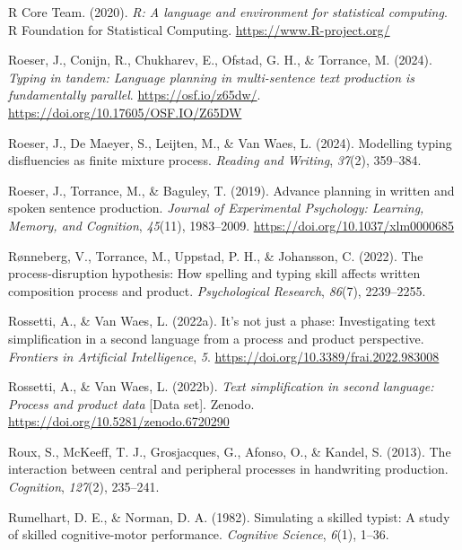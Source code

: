 \documentclass[
  man,floatsintext]{apa7}
\newlength{\cslhangindent}
\newlength{\cslentryspacingunit} %
\newenvironment{CSLReferences}[2] %
 {%
  \setlength{\parindent}{0pt}
  \ifodd #1
  \let\oldpar\par
  \def\par{\hangindent=\cslhangindent\oldpar}
  \fi
  \setlength{\parskip}{#2\cslentryspacingunit}
 }%
 {}
\begin{document}
\begin{CSLReferences}{1}{0}
\leavevmode{}%
R Core Team. (2020). \emph{R: A language and environment for statistical computing}. R Foundation for Statistical Computing. \url{https://www.R-project.org/}

\leavevmode{}%
Roeser, J., Conijn, R., Chukharev, E., Ofstad, G. H., \& Torrance, M. (2024). \emph{Typing in tandem: Language planning in multi-sentence text production is fundamentally parallel}. \url{https://osf.io/z65dw/}. \url{https://doi.org/10.17605/OSF.IO/Z65DW}

\leavevmode{}%
Roeser, J., De Maeyer, S., Leijten, M., \& Van Waes, L. (2024). Modelling typing disfluencies as finite mixture process. \emph{Reading and Writing}, \emph{37}(2), 359--384.

\leavevmode{}%
Roeser, J., Torrance, M., \& Baguley, T. (2019). Advance planning in written and spoken sentence production. \emph{Journal of Experimental Psychology: Learning, Memory, and Cognition}, \emph{45}(11), 1983--2009. \url{https://doi.org/10.1037/xlm0000685}

\leavevmode{}%
Rønneberg, V., Torrance, M., Uppstad, P. H., \& Johansson, C. (2022). The process-disruption hypothesis: How spelling and typing skill affects written composition process and product. \emph{Psychological Research}, \emph{86}(7), 2239--2255.

\leavevmode{}%
Rossetti, A., \& Van Waes, L. (2022a). It's not just a phase: Investigating text simplification in a second language from a process and product perspective. \emph{Frontiers in Artificial Intelligence}, \emph{5}. \url{https://doi.org/10.3389/frai.2022.983008}

\leavevmode{}%
Rossetti, A., \& Van Waes, L. (2022b). \emph{Text simplification in second language: Process and product data} {[}Data set{]}. Zenodo. \url{https://doi.org/10.5281/zenodo.6720290}

\leavevmode{}%
Roux, S., McKeeff, T. J., Grosjacques, G., Afonso, O., \& Kandel, S. (2013). The interaction between central and peripheral processes in handwriting production. \emph{Cognition}, \emph{127}(2), 235--241.

\leavevmode{}%
Rumelhart, D. E., \& Norman, D. A. (1982). Simulating a skilled typist: A study of skilled cognitive-motor performance. \emph{Cognitive Science}, \emph{6}(1), 1--36.


\end{CSLReferences}
\end{document}
